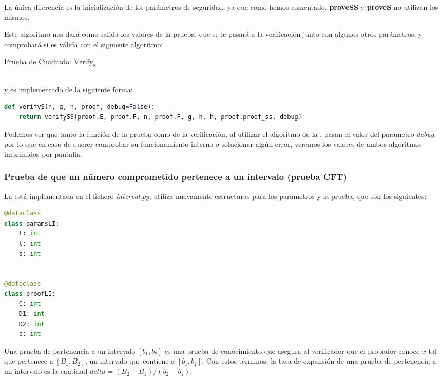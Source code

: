 La única diferencia es la inicialización de los parámetros de seguridad, ya que como hemos comentado, \textbf{proveSS} y \textbf{proveS} no utilizan los mismos.

Este algoritmo nos dará como salida los valores de la prueba, que se le pasará a la verificación junto con algunos otros parámetros, y comprobará si es válida con el siguiente algoritmo: \\
\begin{minipage}{0.9\textwidth}
    \begin{algorithm}[H]
        \caption{Prueba de Cuadrado: $\operatorname{Verify_{S}}$}
    \end{algorithm}
\end{minipage} \\
y es implementado de la siguiente forma:
\begin{lstlisting}[language=Python, basicstyle=\footnotesize]
def verifyS(n, g, h, proof, debug=False):
    return verifySS(proof.E, proof.F, n, proof.F, g, h, h, proof.proof_ss, debug)
\end{lstlisting}

Podemos ver que tanto la función de la prueba como de la verificación, al utilizar el algoritmo de la , pasan el valor del parámetro \textit{debug}, por lo que en caso de querer comprobar su funcionamiento interno o solucionar algún error, veremos los valores de ambos algoritmos imprimidos por pantalla.

\subsubsection{Prueba de que un número comprometido pertenece a un intervalo (prueba CFT)}

La  está implementada en el fichero \emph{interval.py}, utiliza nuevamente estructuras para los parámetros y la prueba, que son los siguientes:
\begin{lstlisting}[language=Python, basicstyle=\footnotesize]
@dataclass
class paramsLI:
    t: int
    l: int
    s: int


@dataclass
class proofLI:
    C: int
    D1: int
    D2: int
    c: int
\end{lstlisting}

Una prueba de pertenencia a un intervalo $[b_{1}, b_{2}]$ es una prueba de conocimiento que asegura al verificador que el probador conoce $x$ tal que pertenece a $[B_{1}, B_{2}]$, un intervalo que contiene a $[b_{1}, b_{2}]$. Con estos términos, la tasa de expansión de una prueba de pertenencia a un intervalo es la cantidad $delta = (B_{2} - B_{1})/(b_{2} - b_{1})$.

